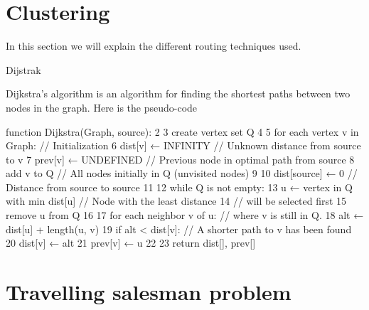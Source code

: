 \section{Clustering} 
\label{Clustering_thecnical}

\label{Routing_thecnical}
In this section we will explain the different routing techniques used.

Dijstrak


Dijkstra's algorithm is an algorithm for finding the shortest paths between two nodes in the graph.
Here is the pseudo-code

function Dijkstra(Graph, source):
 2
 3      create vertex set Q
 4
 5      for each vertex v in Graph:             // Initialization
 6          dist[v] ← INFINITY                  // Unknown distance from source to v
 7          prev[v] ← UNDEFINED                 // Previous node in optimal path from source
 8          add v to Q                          // All nodes initially in Q (unvisited nodes)
 9
10      dist[source] ← 0                        // Distance from source to source
11      
12      while Q is not empty:
13          u ← vertex in Q with min dist[u]    // Node with the least distance
14                                                      // will be selected first
15          remove u from Q 
16          
17          for each neighbor v of u:           // where v is still in Q.
18              alt ← dist[u] + length(u, v)
19              if alt < dist[v]:               // A shorter path to v has been found
20                  dist[v] ← alt 
21                  prev[v] ← u 
22
23      return dist[], prev[]


\section{Travelling salesman problem}




